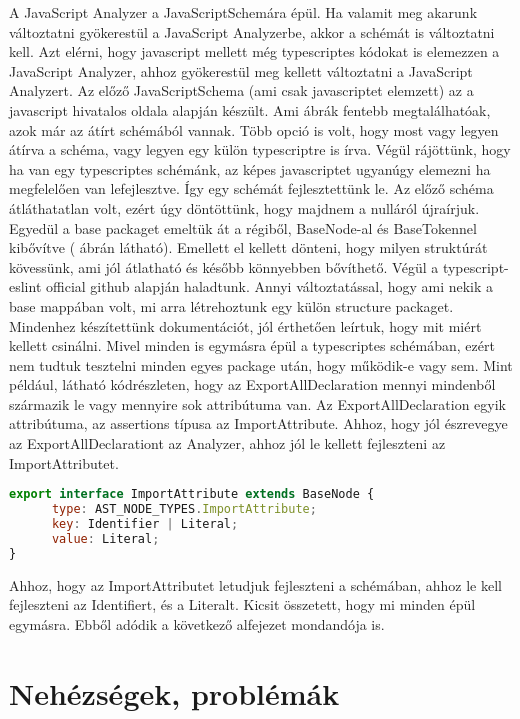 \noindent

A JavaScript Analyzer a JavaScriptSchemára épül. Ha valamit meg akarunk változtatni gyökerestül a JavaScript Analyzerbe, akkor a schémát is változtatni kell.
Azt elérni, hogy javascript mellett még typescriptes kódokat is elemezzen a JavaScript Analyzer, ahhoz gyökerestül meg kellett változtatni a JavaScript Analyzert.
Az előző JavaScriptSchema (ami csak javascriptet elemzett) az a javascript hivatalos oldala alapján készült. Ami ábrák fentebb megtalálhatóak, azok már az átírt schémából vannak.
Több opció is volt, hogy most vagy legyen átírva a schéma, vagy legyen egy külön typescriptre is írva.
Végül rájöttünk, hogy ha van egy typescriptes schémánk, az képes javascriptet ugyanúgy elemezni ha megfelelően van lefejlesztve.
Így egy schémát fejlesztettünk le. Az előző schéma átláthatatlan volt, ezért úgy döntöttünk, hogy majdnem a nulláról újraírjuk.
Egyedül a base packaget emeltük át a régiből, BaseNode-al és BaseTokennel kibővítve ( ábrán látható).
Emellett el kellett dönteni, hogy milyen struktúrát kövessünk, ami jól átlatható és később könnyebben bővíthető.
Végül a typescript-eslint official github alapján haladtunk. Annyi változtatással, hogy ami nekik a base mappában volt, mi arra létrehoztunk egy külön structure packaget.
Mindenhez készítettünk dokumentációt, jól érthetően leírtuk, hogy mit miért kellett csinálni.
Mivel minden is egymásra épül a typescriptes schémában, ezért nem tudtuk tesztelni minden egyes package után, hogy működik-e vagy sem.
Mint például, látható  kódrészleten, hogy az ExportAllDeclaration mennyi mindenből származik le vagy mennyire sok attribútuma van.
Az ExportAllDeclaration egyik attribútuma, az assertions típusa az ImportAttribute. Ahhoz, hogy jól észrevegye az ExportAllDeclarationt az Analyzer, ahhoz jól le kellett fejleszteni az ImportAttributet.

\begin{lstlisting}[caption={ImportAttribute},label={lst:asg_file_import_attribute}, language={JavaScript}]
export interface ImportAttribute extends BaseNode {
      type: AST_NODE_TYPES.ImportAttribute;
      key: Identifier | Literal;
      value: Literal;
}
\end{lstlisting}
Ahhoz, hogy az ImportAttributet letudjuk fejleszteni a schémában, ahhoz le kell fejleszteni az Identifiert, és a Literalt.
Kicsit összetett, hogy mi minden épül egymásra. Ebből adódik a következő alfejezet mondandója is.

\section{Nehézségek, problémák}

